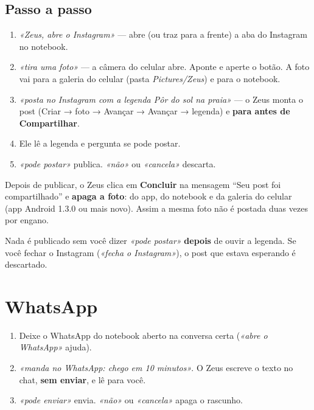\documentclass[11pt,a4paper]{article}
\newcommand{\fala}[1]{\textit{«#1»}}
\begin{document}
\subsection{Passo a passo}
\begin{enumerate}
  \item \fala{Zeus, abre o Instagram} — abre (ou traz para a frente) a aba do Instagram no notebook.
  \item \fala{tira uma foto} — a câmera do celular abre. Aponte e aperte o botão. A foto vai para a
        galeria do celular (pasta \emph{Pictures/Zeus}) e para o notebook.
  \item \fala{posta no Instagram com a legenda Pôr do sol na praia} — o Zeus monta o post
        (Criar → foto → Avançar → Avançar → legenda) e \textbf{para antes de Compartilhar}.
  \item Ele lê a legenda e pergunta se pode postar.
  \item \fala{pode postar} publica. \fala{não} ou \fala{cancela} descarta.
\end{enumerate}

Depois de publicar, o Zeus clica em \textbf{Concluir} na mensagem ``Seu post foi compartilhado''
e \textbf{apaga a foto}: do app, do notebook e da galeria do celular (app Android 1.3.0 ou mais
novo). Assim a mesma foto não é postada duas vezes por engano.

\begin{atencao}
Nada é publicado sem você dizer \fala{pode postar} \textbf{depois} de ouvir a legenda. Se você
fechar o Instagram (\fala{fecha o Instagram}), o post que estava esperando é descartado.
\end{atencao}

\section{WhatsApp}

\begin{enumerate}
  \item Deixe o WhatsApp do notebook aberto na conversa certa (\fala{abre o WhatsApp} ajuda).
  \item \fala{manda no WhatsApp: chego em 10 minutos}. O Zeus escreve o texto no chat,
        \textbf{sem enviar}, e lê para você.
  \item \fala{pode enviar} envia. \fala{não} ou \fala{cancela} apaga o rascunho.
\end{enumerate}
\end{document}
